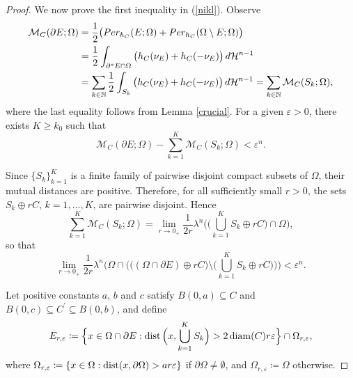 \documentclass[10pt,a4paper]{amsart}
\DeclareMathOperator{\diam}{\textup{diam}}
\DeclareMathOperator{\dist}{\textup{dist}}
\begin{document}
\begin{proof}
We now prove the first inequality in (\ref{nikl}). Observe
\begin{equation*}
\begin{split}
\mathcal{M}_C(\partial E; \Omega)&=\frac{1}{2}\big(\textup{Per}_{h_{C}}(E; \Omega)+\textup{Per}_{h_{C}}(\Omega\setminus E; \Omega)\big)\\
&=\frac{1}{2}\int_{\partial^* E\cap\Omega}\big(h_C(\nu_E)+h_C(-\nu_E)\big)\,d\mathcal{H}^{n-1}\\
&=\sum_{k\in\mathbb{N}}\frac{1}{2}\int_{S_k}\big(h_C(\nu_E)+h_C(-\nu_E)\big)\,d\mathcal{H}^{n-1}=\sum_{k\in\mathbb{N}}\mathcal{M}_C(S_k; \Omega),
\end{split}
\end{equation*}
where the last equality follows from Lemma \ref{crucial}. For a given $\varepsilon>0$, there exists $K\geq k_0$ such that
\[
\mathcal{M}_C(\partial E; \Omega)-\sum_{k=1}^K\mathcal{M}_C(S_k; \Omega)<\varepsilon^{n}.
\]

Since $\{S_k\}_{k=1}^K$ is a finite family of pairwise disjoint compact subsets of $\Omega$, their mutual distances are positive. Therefore, for all sufficiently small $r>0$, the sets $S_k\oplus rC$, $k=1,\dots,K$, are pairwise disjoint. Hence
\begin{equation*}
\sum_{k=1}^K\mathcal{M}_C(S_k; \Omega)=\lim_{r\to0_+}\frac{1}{2r}\lambda^n\bigg(\Big(\bigcup_{k=1}^K S_k\oplus rC\Big)\cap\Omega\bigg),
\end{equation*}
so that
\begin{equation}\label{rum}
\lim_{r\to0_+}\frac{1}{2r}\lambda^n\Bigg(\Omega\cap\bigg(\Big((\Omega\cap\partial E)\oplus rC\Big)\setminus\Big(\bigcup_{k=1}^K S_k\oplus rC\Big)\bigg)\Bigg)<\varepsilon^n.
\end{equation}

Let positive constants $a$, $b$ and $c$ satisfy $B(0,a)\subseteq C$ and $B(0, c)\subseteq C^{\prime}\subseteq B(0,b)$, and define
\[
E_{r, \varepsilon}\coloneq \Big\{x\in \Omega\cap\partial E  : \dist\Big(x, \bigcup_{k=1}^K S_k\Big)>2\diam(C)r\varepsilon \Big\}\cap\Omega_{r, \varepsilon},
\]
where $\Omega_{r, \varepsilon}\coloneq \{x\in\Omega : \dist(x, \partial\Omega)>ar\varepsilon\}$ if $\partial\Omega\neq\emptyset$, and $\Omega_{r, \varepsilon}\coloneq \Omega$ otherwise. %


\end{proof}
\end{document}
